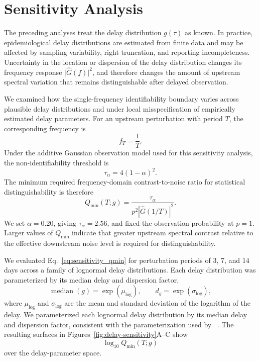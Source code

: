 \renewcommand{\thesection}{S\arabic{section}}
\setcounter{section}{5}
\section{Sensitivity Analysis}
\label{sec:Appendix_S6}

The preceding analyses treat the delay distribution \(g(\tau)\) as known. In practice, epidemiological delay distributions are estimated from finite data and may be affected by sampling variability, right truncation, and reporting incompleteness. Uncertainty in the location or dispersion of the delay distribution changes its frequency response \(\lvert \widehat G(f) \rvert^2\), and therefore changes the amount of upstream spectral variation that remains distinguishable after delayed observation.

We examined how the single-frequency identifiability boundary varies across plausible delay distributions and under local misspecification of empirically estimated delay parameters. For an upstream perturbation with period \(T\), the corresponding frequency is
\[
f_T = \frac{1}{T}.
\]
Under the additive Gaussian observation model used for this sensitivity analysis, the non-identifiability threshold is
\[
\tau_{\alpha}=4(1-\alpha)^2.
\]
The minimum required frequency-domain contrast-to-noise ratio for statistical distinguishability is therefore
\begin{equation}
Q_{\min}(T;g)
=
\frac{\tau_{\alpha}}
{p^2\left\lvert \widehat G(1/T)\right\rvert^2}.
\label{eq:sensitivity_qmin}
\end{equation}
We set \(\alpha=0.20\), giving \(\tau_{\alpha}=2.56\), and fixed the observation probability at \(p=1\). Larger values of \(Q_{\min}\) indicate that greater upstream spectral contrast relative to the effective downstream noise level is required for distinguishability.

We evaluated Eq.~\eqref{eq:sensitivity_qmin} for perturbation periods of 3, 7, and 14 days across a family of lognormal delay distributions. Each delay distribution was parameterized by its median delay and dispersion factor,
\[
\operatorname{median}(g)=\exp(\mu_{\log}),
\qquad
d_g=\exp(\sigma_{\log}),
\]
where \(\mu_{\log}\) and \(\sigma_{\log}\) are the mean and standard deviation of the logarithm of the delay. We parameterized each lognormal delay distribution by its
median delay and dispersion factor, consistent with the
parameterization used by ~\cite{lessler2009incubation}. The resulting surfaces in Figures~\ref{fig:delay-sensitivity}A--C show
\[
\log_{10} Q_{\min}(T;g)
\]
over the delay-parameter space.

